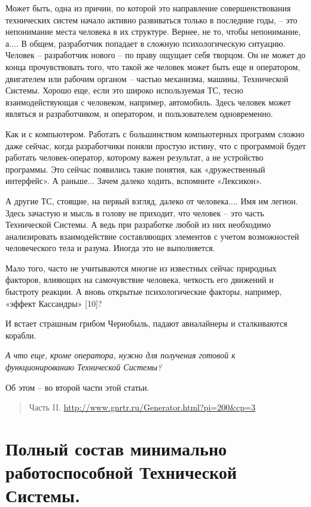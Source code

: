 \documentclass[11pt,a4paper]{article}
\begin{document}
Может быть, одна из причин, по которой это направление совершенствования
технических систем начало активно развиваться только в последние годы, – это
непонимание места человека в их структуре. Вернее, не то, чтобы непонимание,
а.... В общем, разработчик попадает в сложную психологическую
ситуацию. Человек – разработчик нового – по праву ощущает себя творцом. Он не
может до конца прочувствовать того, что такой же человек может быть еще и
оператором, двигателем или рабочим органом – частью механизма, машины,
Технической Системы. Хорошо еще, если это широко используемая ТС, тесно
взаимодействующая с человеком, например, автомобиль. Здесь человек может
являться и разработчиком, и оператором, и пользователем одновременно.

Как и с компьютером. Работать с большинством компьютерных программ сложно даже
сейчас, когда разработчики поняли простую истину, что с программой будет
работать человек-оператор, которому важен результат, а не устройство
программы. Это сейчас появились такие понятия, как «дружественный интерфейс».
А раньше... Зачем далеко ходить, вспомните «Лексикон».

А другие ТС, стоящие, на первый взгляд, далеко от человека.... Имя им легион.
Здесь зачастую и мысль в голову не приходит, что человек – это часть
Технической Системы. А ведь при разработке любой из них необходимо
анализировать взаимодействие составляющих элементов с учетом возможностей
человеческого тела и разума. Иногда это не выполняется.

Мало того, часто не учитываются многие из известных сейчас природных факторов,
влияющих на самочувствие человека, четкость его движений и быстроту реакции. А
вновь открытые психологические факторы, например, «эффект Кассандры» [10]?

И встает страшным грибом Чернобыль, падают авиалайнеры и сталкиваются корабли. 

\emph{А что еще, кроме оператора, нужно для получения готовой к функционированию
Технической Системы?}

Об этом – во второй части этой статьи.

\newpage
\begin{quote}
  Часть II. \url{http://www.gnrtr.ru/Generator.html?pi=200&cp=3}
\end{quote}

\section*{Полный состав минимально работоспособной Технической Системы.}
\end{document}
